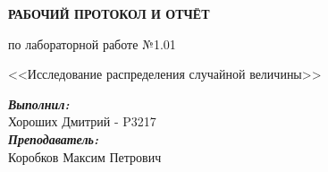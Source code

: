 \documentclass[12pt, a4paper]{article}
\begin{document}

\vspace*{0.25\textheight}
\begin{center}
\textbf{\LARGE РАБОЧИЙ ПРОТОКОЛ И ОТЧЁТ }

\LARGE по лабораторной работе №1.01

\LARGE <<Исследование распределения случайной величины>>

\end{center}
\vspace*{5cm}
\begin{flushright}
\begin{minipage}{.33\linewidth}
\textit{\textbf{Выполнил:}}\\
Хороших Дмитрий - P3217\\
\textit{\textbf{Преподаватель:}}\\
Коробков Максим Петрович
\end{minipage}
\end{flushright}


\thispagestyle{firstpage}
\newpage
\tableofcontents

\restoregeometry
\end{document}
